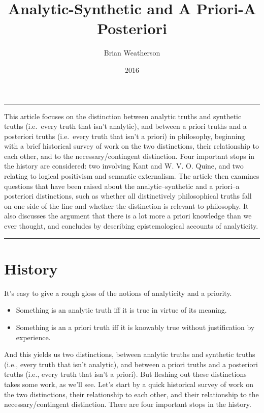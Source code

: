 \documentclass[
  10pt,
  letterpaper,
  DIV=11,
  numbers=noendperiod,
  twoside]{scrartcl}
\title{Analytic-Synthetic and A Priori-A Posteriori}
\author{Brian Weatherson}
\date{2016}
\providecommand{\tightlist}{%
  \setlength{\itemsep}{0pt}\setlength{\parskip}{0pt}}\usepackage{longtable,booktabs,array}
\renewenvironment{abstract}
 {\vspace{-1.25cm}
 \quotation\small\noindent\rule{\linewidth}{.5pt}\par\smallskip
 \noindent }
 {\par\noindent\rule{\linewidth}{.5pt}\endquotation}
\begin{document}
\maketitle
\begin{abstract}
This article focuses on the distinction between analytic truths and
synthetic truths (i.e.~every truth that isn't analytic), and between a
priori truths and a posteriori truths (i.e.~every truth that isn't a
priori) in philosophy, beginning with a brief historical survey of work
on the two distinctions, their relationship to each other, and to the
necessary/contingent distinction. Four important stops in the history
are considered: two involving Kant and W. V. O. Quine, and two relating
to logical positivism and semantic externalism. The article then
examines questions that have been raised about the analytic--synthetic
and a priori--a posteriori distinctions, such as whether all
distinctively philosophical truths fall on one side of the line and
whether the distinction is relevant to philosophy. It also discusses the
argument that there is a lot more a priori knowledge than we ever
thought, and concludes by describing epistemological accounts of
analyticity.
\end{abstract}


\section{History}\label{history}

It's easy to give a rough gloss of the notions of analyticity and a
priority.

\begin{itemize}
\tightlist
\item
  Something is an analytic truth iff it is true in virtue of its
  meaning.
\item
  Something is an a priori truth iff it is knowably true without
  justification by experience.
\end{itemize}

And this yields us two distinctions, between analytic truths and
synthetic truths (i.e., every truth that isn't analytic), and between a
priori truths and a posteriori truths (i.e., every truth that isn't a
priori). But fleshing out these distinctions takes some work, as we'll
see. Let's start by a quick historical survey of work on the two
distinctions, their relationship to each other, and their relationship
to the necessary/contingent distinction. There are four important stops
in the history.
\end{document}
